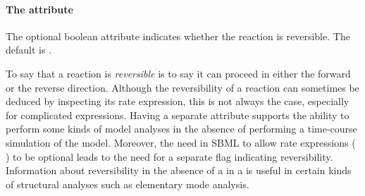 \clearpage

\paragraph{The  attribute}
\label{sec:reversible}

The optional boolean attribute  indicates whether
the reaction is reversible.  The default is .

To say that a reaction is \emph{reversible} is to say it can
proceed in either the forward or the reverse direction.  Although
the reversibility of a reaction can sometimes be deduced by
inspecting its rate expression, this is not always the case,
especially for complicated expressions.  Having a separate attribute
supports the ability to perform some kinds of model analyses in
the absence of performing a time-course simulation of the model.
Moreover, the need in SBML to allow rate expressions (\ie
\KineticLaw) to be optional leads to the need for a separate flag
indicating reversibility.  Information about reversibility in the
absence of a \KineticLaw in a \Reaction is useful in certain kinds
of structural analyses such as elementary mode analysis.

